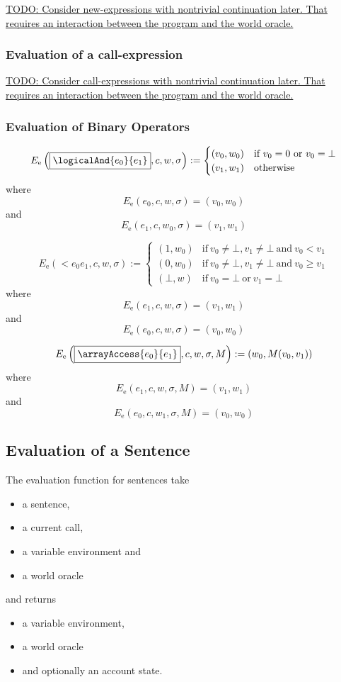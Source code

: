\documentclass{book}
\newcommand{\todo}[1]{\underline{TODO: {#1}}}
\newcommand{\evalE}[1]{E_\mathrm{e}\left({#1}\right)}
\begin{document}
\todo{Consider new-expressions with nontrivial continuation later.  That requires an interaction between the program and the world oracle. }

\subsubsection{Evaluation of a call-expression}

\todo{Consider call-expressions with nontrivial continuation later.  That requires an interaction between the program and the world oracle. }

\subsubsection{Evaluation of Binary Operators}

\[
\evalE{\boxed{\logicalAnd{e_0}{e_1}}, c, w, \sigma} :=
\begin{cases}
  (v_0, w_0) & \text{if}\ v_0 = 0\ \text{or}\ v_0 = \bot \\
  (v_1, w_1) & \text{otherwise}
\end{cases}
\]
where
\[
\evalE{\boxed{e_0}, c, w, \sigma} = (v_0, w_0)
\]
and
\[
\evalE{\boxed{e_1}, c, w_0, \sigma} = (v_1, w_1)
\]

\[
\evalE{\boxed{\lt{e_0}{e_1}}, c, w, \sigma} :=
\begin{cases}
  (1, w_0) &\text{if}\ v_0 \neq \bot, v_1 \neq\bot\ \text{and}\ v_0 < v_1 \\
  (0, w_0) &\text{if}\ v_0 \neq \bot, v_1 \neq\bot\ \text{and}\ v_0 \ge v_1 \\
  (\bot, w) &\text{if}\ v_0 = \bot \ \text{or}\ v_1 = \bot
\end{cases}
\]
where
\[
\evalE{\boxed{e_1}, c, w, \sigma} = (v_1, w_1)
\]
and
\[
\evalE{\boxed{e_0}, c, w, \sigma} = (v_0, w_0)
\]

\[
\evalE{\boxed{\arrayAccess{e_0}{e_1}}, c, w, \sigma, M} :=
(w_0, M(v_0, v_1))
\]
where
\[
\evalE{\boxed{e_1}, c, w, \sigma, M} = (v_1, w_1)
\]
and
\[
\evalE{\boxed{e_0}, c, w_1, \sigma, M} = (v_0, w_0)
\]

\subsection{Evaluation of a Sentence}

The evaluation function for sentences take
\begin{itemize}
\item a sentence,
\item a current call,
\item a variable environment and
\item a world oracle
\end{itemize}
and returns
\begin{itemize}
\item a variable environment,
\item a world oracle
\item and optionally an account state.
\end{itemize}
\end{document}
